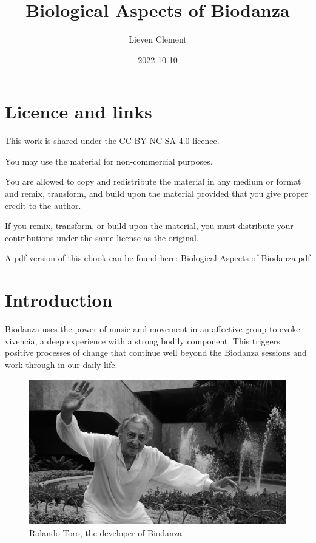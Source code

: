 \documentclass[
  11pt,
]{book}
\title{Biological Aspects of Biodanza}
\author{Lieven Clement}
\date{2022-10-10}
\begin{document}
\maketitle

{
\hypersetup{linkcolor=}
\setcounter{tocdepth}{2}
\tableofcontents
}
\hypertarget{licence-and-links}{%
\chapter*{Licence and links}\label{licence-and-links}}

This work is shared under the
CC BY-NC-SA 4.0 licence.

You may use the material for non-commercial purposes.

You are allowed to copy and redistribute the material in any medium or format and remix, transform, and build upon the material provided that you give proper credit to the author.

If you remix, transform, or build upon the material, you must distribute your contributions under the same license as the original.

A pdf version of this ebook can be found here: \href{https://biodanzabrugge.be/biologicalAspectsBiodanza/Biological-Aspects-of-Biodanza.pdf}{Biological-Aspects-of-Biodanza.pdf}

\hypertarget{intro}{%
\chapter{Introduction}\label{intro}}

Biodanza uses the power of music and movement in an affective group to evoke vivencia, a deep experience with a strong bodily component. This triggers positive processes of change that continue well beyond the Biodanza sessions and work through in our daily life.

\begin{figure}

{\centering \includegraphics[width=0.45\linewidth]{./figs/rolando} 

}

\caption{Rolando Toro, the developer of Biodanza}\label{fig:rolandoToro}
\end{figure}
\end{document}
